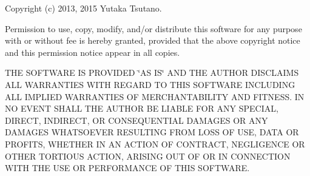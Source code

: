 Copyright (c) 2013, 2015 Yutaka Tsutano.

Permission to use, copy, modify, and/or distribute this software for any purpose with or without fee is hereby granted, provided that the above copyright notice and this permission notice appear in all copies.

T\-H\-E S\-O\-F\-T\-W\-A\-R\-E I\-S P\-R\-O\-V\-I\-D\-E\-D \char`\"{}\-A\-S I\-S\char`\"{} A\-N\-D T\-H\-E A\-U\-T\-H\-O\-R D\-I\-S\-C\-L\-A\-I\-M\-S A\-L\-L W\-A\-R\-R\-A\-N\-T\-I\-E\-S W\-I\-T\-H R\-E\-G\-A\-R\-D T\-O T\-H\-I\-S S\-O\-F\-T\-W\-A\-R\-E I\-N\-C\-L\-U\-D\-I\-N\-G A\-L\-L I\-M\-P\-L\-I\-E\-D W\-A\-R\-R\-A\-N\-T\-I\-E\-S O\-F M\-E\-R\-C\-H\-A\-N\-T\-A\-B\-I\-L\-I\-T\-Y A\-N\-D F\-I\-T\-N\-E\-S\-S. I\-N N\-O E\-V\-E\-N\-T S\-H\-A\-L\-L T\-H\-E A\-U\-T\-H\-O\-R B\-E L\-I\-A\-B\-L\-E F\-O\-R A\-N\-Y S\-P\-E\-C\-I\-A\-L, D\-I\-R\-E\-C\-T, I\-N\-D\-I\-R\-E\-C\-T, O\-R C\-O\-N\-S\-E\-Q\-U\-E\-N\-T\-I\-A\-L D\-A\-M\-A\-G\-E\-S O\-R A\-N\-Y D\-A\-M\-A\-G\-E\-S W\-H\-A\-T\-S\-O\-E\-V\-E\-R R\-E\-S\-U\-L\-T\-I\-N\-G F\-R\-O\-M L\-O\-S\-S O\-F U\-S\-E, D\-A\-T\-A O\-R P\-R\-O\-F\-I\-T\-S, W\-H\-E\-T\-H\-E\-R I\-N A\-N A\-C\-T\-I\-O\-N O\-F C\-O\-N\-T\-R\-A\-C\-T, N\-E\-G\-L\-I\-G\-E\-N\-C\-E O\-R O\-T\-H\-E\-R T\-O\-R\-T\-I\-O\-U\-S A\-C\-T\-I\-O\-N, A\-R\-I\-S\-I\-N\-G O\-U\-T O\-F O\-R I\-N C\-O\-N\-N\-E\-C\-T\-I\-O\-N W\-I\-T\-H T\-H\-E U\-S\-E O\-R P\-E\-R\-F\-O\-R\-M\-A\-N\-C\-E O\-F T\-H\-I\-S S\-O\-F\-T\-W\-A\-R\-E. 